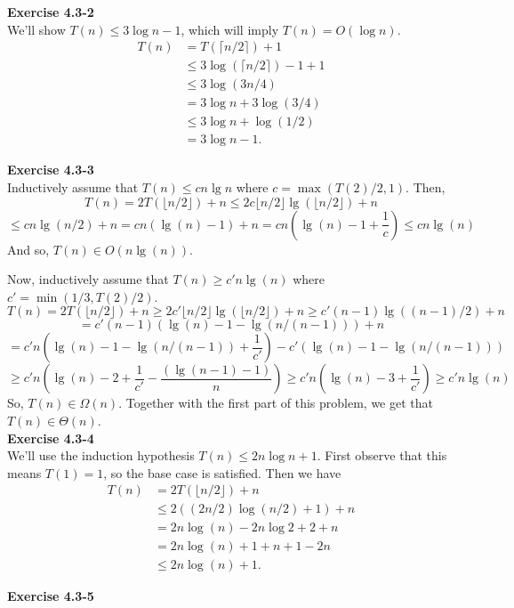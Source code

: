\documentclass{article}
\begin{document}
\noindent\textbf{Exercise 4.3-2}\\

We'll show $T(n) \leq 3 \log n - 1$, which will imply $T(n) = O(\log n)$.
\begin{align*}
T(n) &= T(\lceil n/2 \rceil) + 1 \\
&\leq 3\log(\lceil n/2 \rceil) - 1 + 1 \\
&\leq 3\log(3n/4) \\
&= 3 \log n + 3 \log(3/4) \\
&\leq 3 \log n  + \log(1/2) \\
& = 3 \log n - 1. 
\end{align*}

\noindent\textbf{Exercise 4.3-3}\\

Inductively assume that $T(n) \le cn\lg n$ where $c = \max(T(2)/2,1)$. Then, 
\[
T(n) = 2 T(\lfloor n/2\rfloor) + n \le 2 c\lfloor n/2 \rfloor \lg(\lfloor n/2\rfloor) +n
\]
\[
\le cn \lg(n/2) +n = cn (\lg(n) - 1) +n = cn(\lg(n) -1+\frac{1}{c}) \le cn\lg(n)
\]
And so, $T(n)\in O(n\lg(n))$.

Now, inductively assume that $T(n)\ge c'n\lg(n)$ where $c' = \min(1/3, T(2)/2)$. 
\[
T(n) = 2 T(\lfloor n/2 \rfloor) +n \ge 2c'\lfloor n/2 \rfloor \lg(\lfloor n/2 \rfloor) + n \ge c'(n-1) \lg((n-1)/2) +n
\]
\[
= c'(n-1)(\lg(n) - 1 - \lg(n/(n-1))) +n\]\[ = c' n (\lg(n) -1 -\lg(n/(n-1)) + \frac{1}{c'}) - c'(\lg(n) - 1 -\lg(n/(n-1)))
\]
\[
\ge c'n(\lg(n)-2 + \frac{1}{c'} - \frac{(\lg(n-1) - 1 )}{n}) \ge c'n(\lg(n)-3 + \frac{1}{c'}) \ge c'n\lg(n)
\]
So, $T(n)\in \Omega(n)$. Together with the first part of this problem, we get that $T(n)\in \Theta(n)$.\\

\noindent\textbf{Exercise 4.3-4}\\

We'll use the induction hypothesis $T(n) \leq 2n \log n + 1$. First observe that this means $T(1) = 1$, so the base case is satisfied.  Then we have
\begin{align*}
T(n) &= 2T(\lfloor n/2 \rfloor) + n\\
&\leq 2((2n/2)\log(n/2) + 1) + n \\
&= 2n\log(n) - 2n \log 2 + 2 + n \\
&= 2n \log(n) + 1 + n + 1 - 2n \\
& \leq 2n \log(n) + 1.
\end{align*}

\noindent\textbf{Exercise 4.3-5}\\
\end{document}
